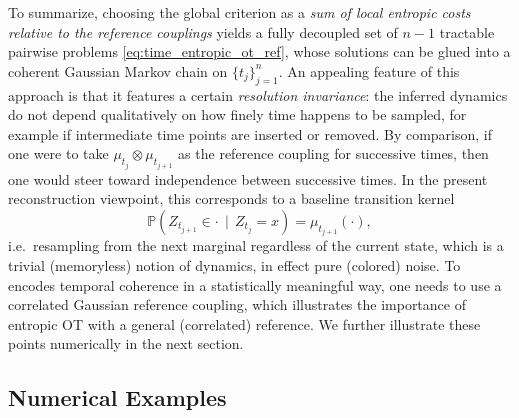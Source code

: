 \documentclass[]{article}
\numberwithin{equation}{section}
\theoremstyle{plain}
\begin{document}
{\begin{algorithm}[ht]
	
	\caption{Dynamic induced by entropic optimal transport with reference process}
	\label{alg:sampling_markovian_eot}
\end{algorithm}

To summarize, choosing the global criterion as a \emph{sum of local entropic costs relative to the reference couplings}
yields a fully decoupled set of $n-1$ tractable pairwise problems \eqref{eq:time_entropic_ot_ref},
whose solutions can be glued into a coherent Gaussian Markov chain on $\{t_j\}_{j=1}^{n}$. An appealing feature of this approach is that it features a certain \emph{resolution invariance}: the inferred dynamics do not depend qualitatively on how finely time happens to be sampled, for example if intermediate time points are inserted or removed. By comparison, if one were to take $\mu_{t_{j}}\otimes\mu_{t_{j+1}}$ as the reference coupling for successive times, then one would steer toward independence between successive times.
In the present reconstruction viewpoint, this corresponds to a baseline transition kernel
\begin{equation*}
\mathbb{P}(Z_{t_{j+1}}\in\cdot\,\mid\,Z_{t_j}=x)=\mu_{t_{j+1}}(\cdot),
\end{equation*}
i.e.\ resampling from the next marginal regardless of the current state, which is a trivial (memoryless) notion of dynamics, in effect pure (colored) noise.
To encodes temporal coherence in a statistically meaningful way, one needs to use a correlated Gaussian reference coupling, which illustrates the importance of entropic OT with a general (correlated) reference. We further illustrate these points numerically in the next section.


\subsection{Numerical Examples}\label{sec:numerical_experiments}

}
\end{document}
